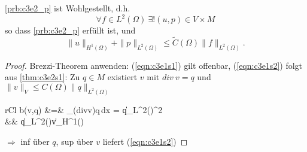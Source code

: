 \documentclass[../skript.tex]{subfiles}
\begin{document}
\begin{theorem}\label{thm:c3e2s2}
	\cref{prb:c3e2_p} ist Wohlgestellt, d.h.
	\[
		\forall f\in L^2(\Omega)\:\exists! (u,p)\in V\times M
	\]
	so dass \cref{prb:c3e2_p} erfüllt ist, und
	\[
		\|u\|_{H^1(\Omega)} + \|p\|_{L^2(\Omega)} \leq \tilde{C}(\Omega) \|f\|_{L^2(\Omega)}.
	\]
\end{theorem}

\begin{proof}
	Brezzi-Theorem anwenden: (\ref{eqn:c3e1s1}) gilt offenbar, (\ref{eqn:c3e1s2}) folgt aus \cref{thm:c3e2s1}:\newline\noindent
	Zu $q\in M$ existiert $v$ mit $div\:v = q$ und $\|v\|_V\leq C(\Omega)\|q\|_{L^2(\Omega)}$
	\begin{IEEEeqnarray*}{rCl}
		b(v,q) &=& \int_\Omega (div\:v)\:q\,dx = \|q\|_{L^2(\Omega)}^2\\
		&\geq& \|q\|_{L^2(\Omega)}\|v\|_{H^1(\Omega)}
	\end{IEEEeqnarray*}
	$\Rightarrow$ inf über $q$, sup über $v$ liefert (\ref{eqn:c3e1s2})
\end{proof}
\end{document}

